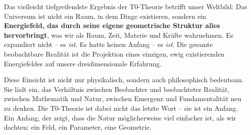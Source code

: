 \documentclass[11pt,openright,twoside]{book}
\begin{document}
Das vielleicht tiefgreifendste Ergebnis der T0-Theorie betrifft unser Weltbild: Das Universum ist nicht ein Raum, in dem Dinge existieren, sondern ein \textbf{Energiefeld, das durch seine eigene geometrische Struktur alles hervorbringt}, was wir als Raum, Zeit, Materie und Kräfte wahrnehmen. Es expandiert nicht -- es \textit{ist}. Es hatte keinen Anfang -- es \textit{ist}. Die gesamte beobachtbare Realität ist die Projektion eines einzigen, ewig existierenden Energiefeldes auf unsere dreidimensionale Erfahrung.

Diese Einsicht ist nicht nur physikalisch, sondern auch philosophisch bedeutsam. Sie lädt ein, das Verhältnis zwischen Beobachter und beobachteter Realität, zwischen Mathematik und Natur, zwischen Emergenz und Fundamentalität neu zu denken. Die T0-Theorie ist dabei nicht das letzte Wort -- sie ist ein Anfang. Ein Anfang, der zeigt, dass die Natur möglicherweise viel einfacher ist, als wir dachten: ein Feld, ein Parameter, eine Geometrie.
\end{document}
